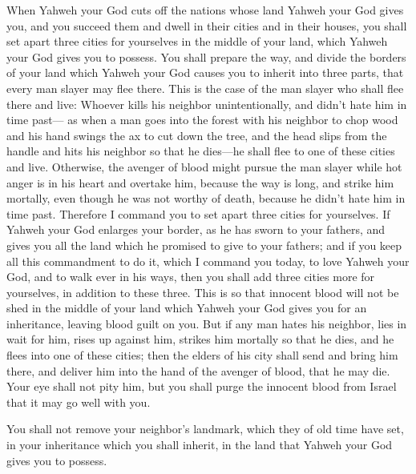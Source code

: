  When Yahweh your God cuts off the nations whose land Yahweh
your God gives you, and you succeed them and dwell in their cities and
in their houses,  you shall set apart three cities for
yourselves in the middle of your land, which Yahweh your God gives you
to possess.  You shall prepare the way, and divide the
borders of your land which Yahweh your God causes you to inherit into
three parts, that every man slayer may flee there.  This is
the case of the man slayer who shall flee there and live: Whoever kills
his neighbor unintentionally, and didn't hate him in time past---
 as when a man goes into the forest with his neighbor to
chop wood and his hand swings the ax to cut down the tree, and the head
slips from the handle and hits his neighbor so that he dies---he shall
flee to one of these cities and live.  Otherwise, the
avenger of blood might pursue the man slayer while hot anger is in his
heart and overtake him, because the way is long, and strike him
mortally, even though he was not worthy of death, because he didn't hate
him in time past.  Therefore I command you to set apart
three cities for yourselves.  If Yahweh your God enlarges
your border, as he has sworn to your fathers, and gives you all the land
which he promised to give to your fathers;  and if you keep
all this commandment to do it, which I command you today, to love Yahweh
your God, and to walk ever in his ways, then you shall add three cities
more for yourselves, in addition to these three.  This is
so that innocent blood will not be shed in the middle of your land which
Yahweh your God gives you for an inheritance, leaving blood guilt on
you.  But if any man hates his neighbor, lies in wait for
him, rises up against him, strikes him mortally so that he dies, and he
flees into one of these cities;  then the elders of his
city shall send and bring him there, and deliver him into the hand of
the avenger of blood, that he may die.  Your eye shall not
pity him, but you shall purge the innocent blood from Israel that it may
go well with you.

 You shall not remove your neighbor's landmark, which they
of old time have set, in your inheritance which you shall inherit, in
the land that Yahweh your God gives you to possess.

